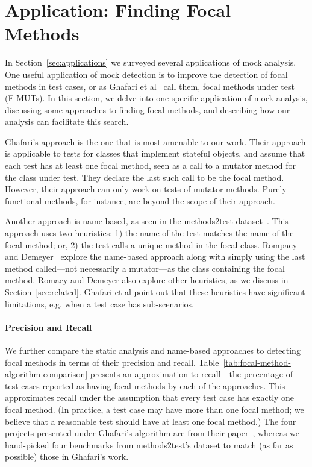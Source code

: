 \section{Application: Finding Focal Methods}
\label{sec:focal}

In Section~\ref{sec:applications} we surveyed several applications of mock analysis.
One useful application of mock detection is to
improve the detection of focal methods in test cases, or as Ghafari et
al~\cite{ghafari15:_autom} call them, focal methods under test
(F-MUTs). In this section, we delve into one specific application of mock analysis, 
discussing some approaches to finding
focal methods, and describing how our analysis can facilitate this search.

Ghafari's approach is the one that is most amenable to our work.
Their approach is applicable to tests for classes that implement
stateful objects, and assume that each test has at least one focal
method, seen as a call to a mutator method for the class under test.
They declare the last such call to be the focal method. However, their approach can
only work on tests of mutator methods.  Purely-functional methods, for
instance, are beyond the scope of their approach.

Another approach is name-based, as seen in the methods2test
dataset~\cite{tufano2020unit}.  This approach uses two heuristics: 1)
the name of the test matches the name of the focal method; or, 2) the
test calls a unique method in the focal class. Rompaey and
Demeyer~\cite{rompaey09:_estab_traceab_links_unit_test} explore the
name-based approach along with simply using the last method called---not necessarily a mutator---as the class containing the focal method.  Romaey and Demeyer also
explore other heuristics, as we discuss in Section~\ref{sec:related}. Ghafari et al point out
that these heuristics have significant limitations, e.g. when a
test case has sub-scenarios.

\paragraph{Precision and Recall}
We further compare the static analysis and name-based approaches to detecting focal methods in terms of their precision and recall. Table~\ref{tab:focal-method-algorithm-comparison} presents an approximation to recall---the percentage of test cases reported as having focal methods by each of the approaches. This approximates recall under the assumption that every test case has exactly one focal method. (In practice, a test case may have more than one focal method; we believe that a reasonable test should have at least one focal method.) The four projects presented under Ghafari's algorithm are from their paper~\cite{ghafari15:_autom}, whereas we hand-picked four benchmarks from methods2test's dataset to match (as far as possible) those in Ghafari's work.

